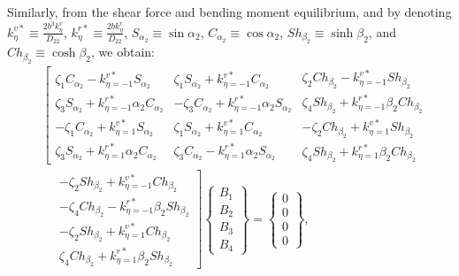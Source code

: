 \documentclass[preprint,12pt,number]{elsarticle}
\begin{document}
%
Similarly, from the shear force and bending moment equilibrium, and by denoting 
$k^{v*}_{\eta} \equiv \frac{2b^3 k^v_{\eta}}{D_{22}} $, 
$ k^{r*}_{\eta} \equiv \frac{2b k^r_{\eta}}{D_{22}} $, 
$S_{\alpha_2}\equiv\sin\alpha_2  $, 
$ C_{\alpha_2}\equiv\cos\alpha_2  $, 
$ Sh_{\beta_2}\equiv\sinh\beta_2$, and 
$Ch_{\beta_2}\equiv \cosh\beta_2$, 
we obtain:
%
\begin{equation}\label{eq:ABy}
\begin{split}
	&\left[ \begin{array}{c}
		\zeta_1C_{\alpha_2}-k^{v*}_{\eta=-1}S_{\alpha_2} \\ \zeta_3S_{\alpha_2}+k^{r*}_{\eta=-1}\alpha_2C_{\alpha_2} \\ -\zeta_1C_{\alpha_2}+k^{v*}_{\eta=1}S_{\alpha_2} \\ \zeta_3S_{\alpha_2}+k^{r*}_{\eta=1}\alpha_2C_{\alpha_2}
	\end{array} \begin{array}{c}
		\zeta_1S_{\alpha_2}+k^{v*}_{\eta=-1}C_{\alpha_2} \\ -\zeta_3C_{\alpha_2}+k^{r*}_{\eta=-1}\alpha_2S_{\alpha_2} \\ \zeta_1S_{\alpha_2}+k^{v*}_{\eta=1}C_{\alpha_2} \\ \zeta_3C_{\alpha_2}-k^{r*}_{\eta=1}\alpha_2S_{\alpha_2}
	\end{array} \begin{array}{c}
		\zeta_2Ch_{\beta_2}-k^{v*}_{\eta=-1}Sh_{\beta_2} \\ \zeta_4Sh_{\beta_2}+k^{r*}_{\eta=-1}\beta_2Ch_{\beta_2} \\ -\zeta_2Ch_{\beta_2}+k^{v*}_{\eta=1}Sh_{\beta_2} \\ \zeta_4Sh_{\beta_2}+k^{r*}_{\eta=1}\beta_2Ch_{\beta_2}
	\end{array} \right. \\
	&\quad
	\left. \begin{array}{c}
		-\zeta_2Sh_{\beta_2}+k^{v*}_{\eta=-1}Ch_{\beta_2} \\ -\zeta_4Ch_{\beta_2}-k^{r*}_{\eta=-1}\beta_2Sh_{\beta_2} \\ -\zeta_2Sh_{\beta_2}+k^{v*}_{\eta=1}Ch_{\beta_2} \\ \zeta_4Ch_{\beta_2}+k^{r*}_{\eta=1}\beta_2Sh_{\beta_2}
	\end{array} \right]\begin{Bmatrix}
		B_1\\B_2\\B_3\\B_4
	\end{Bmatrix}=\begin{Bmatrix}
		0\\0\\0\\0
	\end{Bmatrix},
\end{split}
\end{equation}
\end{document}
